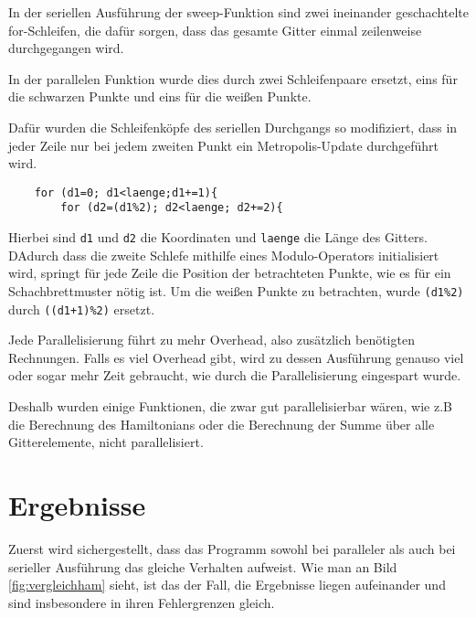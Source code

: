\documentclass{scrreprt}
\begin{document}
	In der seriellen Ausführung der sweep-Funktion sind zwei ineinander geschachtelte for-Schleifen, die dafür sorgen, dass das gesamte Gitter einmal zeilenweise durchgegangen wird.
	
	In der parallelen Funktion wurde dies durch zwei Schleifenpaare ersetzt, eins für die schwarzen Punkte und eins für die weißen Punkte.
	
	Dafür wurden die Schleifenköpfe des seriellen Durchgangs so modifiziert, dass in jeder Zeile nur bei jedem zweiten Punkt ein Metropolis-Update durchgeführt wird. 
	\begin{verbatim}
	for (d1=0; d1<laenge;d1+=1){
		for (d2=(d1%2); d2<laenge; d2+=2){
	\end{verbatim}
	Hierbei sind \texttt{d1} und \texttt{d2} die Koordinaten und \texttt{laenge} die Länge des Gitters. DAdurch dass die zweite Schlefe mithilfe eines Modulo-Operators initialisiert wird, springt für jede Zeile die Position der betrachteten Punkte, wie es für ein Schachbrettmuster nötig ist. Um die weißen Punkte zu betrachten, wurde \texttt{(d1\%2)} durch \texttt{((d1+1)\%2)} ersetzt.
	
	Jede Parallelisierung führt zu mehr Overhead, also zusätzlich benötigten Rechnungen. Falls es viel Overhead gibt, wird zu dessen Ausführung genauso viel oder sogar mehr Zeit gebraucht, wie durch die Parallelisierung eingespart wurde.
	
	Deshalb wurden einige Funktionen, die zwar gut parallelisierbar wären, wie z.B die Berechnung des Hamiltonians oder die Berechnung der Summe über alle Gitterelemente, nicht parallelisiert.
	

	

	
	 	
	\chapter{Ergebnisse}
	\label{chap:ergebnisse}
	
	Zuerst wird sichergestellt, dass das Programm sowohl bei paralleler als auch bei serieller Ausführung das gleiche Verhalten aufweist. Wie man an Bild \ref{fig:vergleichham} sieht, ist das der Fall, die Ergebnisse liegen aufeinander und sind insbesondere in ihren Fehlergrenzen gleich.
	
\end{document}
